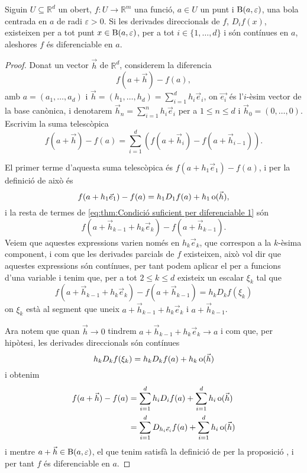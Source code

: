 \documentclass[../Apunts.tex]{subfiles}
\begin{document}
	\begin{theorem}
		\label{thm:Condició suficient per diferenciable}
		Siguin \(U\subseteq\mathbb{R}^{d}\) un obert, \(f\colon U\to\mathbb{R}^{m}\) una funció, \(a\in U\) un punt i \(\operatorname{B}(a,\varepsilon)\), una bola centrada en \(a\) de radi \(\varepsilon>0\). Si les derivades direccionals de \(f\), \(D_{i}f(x)\), existeixen per a tot punt \(x\in\operatorname{B}(a,\varepsilon)\), per a tot \( i\in\{1,\dots,d\}\) i són contínues en \(a\), aleshores \(f\) és diferenciable en \(a\).
		\begin{proof}
			Donat un vector \(\vec{h}\) de \(\mathbb{R}^{d}\), considerem la diferencia
			\[f(a+\vec{h})-f(a),\]
			amb \(a=(a_{1},\dots,a_{d})\) i \(\vec{h}=(h_{1},\dots,h_{d})=\sum_{i=1}^{d}h_{i}\vec{e}_{i}\), on \(\vec{e_{i}}\) és l'\(i\)-èsim vector de la base canònica, i denotarem \(\vec{h}_{n}=\sum_{i=1}^{n}h_{i}\vec{e}_{i}\) per a \(1\leq n\leq d\) i \(\vec{h}_{0}=(0,\dots,0)\). Escrivim la suma telescòpica
			\begin{equation}\label{eq:thm:Condició suficient per diferenciable 1}
			f(a+\vec{h})-f(a)=\sum_{i=1}^{d}\left(f(a+\vec{h}_{i})-f(a+\vec{h}_{i-1})\right).
			\end{equation}
			
			El primer terme d'aquesta suma telescòpica és \(f(a+h_{1}\vec{e}_{1})-f(a)\), i per la definició de  això és
			\[f(a+h_{1}\vec{e}_{1})-f(a)=h_{1}D_{1}f(a)+h_{1}\operatorname{o}(\vec{h}),\]
			i la resta de termes de \eqref{eq:thm:Condició suficient per diferenciable 1} són
			\[f(a+\vec{h}_{k-1}+h_{k}\vec{e}_{k})-f(a+\vec{h}_{k-1}).\]
			Veiem que aquestes expressions varien només en \(h_{k}\vec{e}_{k}\), que correspon a la \(k\)-èsima component, i com que les derivades parcials de \(f\) existeixen, això vol dir que aquestes expressions són contínues, per tant podem aplicar el  per a funcions d'una variable i tenim que, per a tot \(2\leq k\leq d\) existeix un escalar \(\xi_{k}\) tal que
			\[f(a+\vec{h}_{k-1}+h_{k}\vec{e}_{k})-f(a+\vec{h}_{k-1})=h_{k}D_{k}f(\xi_{k})\]
			on \(\xi_{k}\) està al segment que uneix \(a+\vec{h}_{k-1}+h_{k}\vec{e}_{k}\) i \(a+\vec{h}_{k-1}\).
			
			Ara notem que quan \(\vec{h}\to0\) tindrem \(a+\vec{h}_{k-1}+h_{k}\vec{e}_{k}\to a\) i com que, per hipòtesi, les derivades direccionals són contínues
			\[h_{k}D_{k}f(\xi_{k})=h_{k}D_{k}f(a)+h_{k}\operatorname{o}(\vec{h})\]
			i obtenim
			\begin{align*}
			f(a+\vec{h})-f(a)&=\sum_{i=1}^{d}h_{i}D_{i}f(a)+\sum_{i=1}^{d}h_{i}\operatorname{o}(\vec{h})\\
			&=\sum_{i=1}^{d}D_{h_{i}\vec{e}_{i}}f(a)+\sum_{i=1}^{d}h_{i}\operatorname{o}(\vec{h})
			\end{align*}
			i mentre \(a+\vec{h}\in\operatorname{B}(a,\varepsilon)\), el que tenim satisfà la definició de  per la proposició , i per tant \(f\) és diferenciable en \(a\).
		\end{proof}
	\end{theorem}
\end{document}
